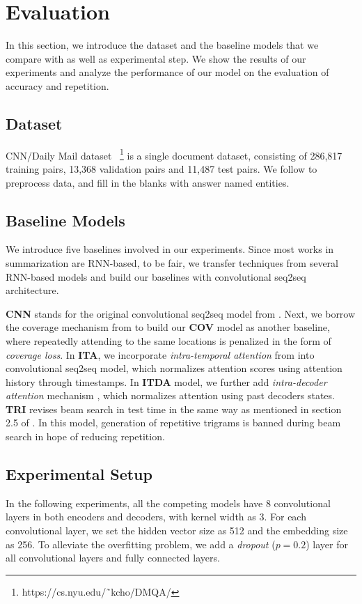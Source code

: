 \section{Evaluation}
\label{sec:eval}
In this section, we introduce the dataset 
and the baseline models that we compare with 
as well as experimental step.
We show the results of our experiments and analyze 
the performance of our model on the evaluation of accuracy
and repetition.


\subsection{Dataset}
CNN/Daily Mail dataset~\cite{HermannKGEKSB15,NallapatiZSGX16,SeeLM17}
\footnote{https://cs.nyu.edu/˜kcho/DMQA/} is a single document dataset,
consisting of 286,817 training pairs,
13,368 validation pairs and 11,487 test pairs.
We follow  to preprocess data,
and fill in the blanks with answer named entities.

\subsection{Baseline Models}
We introduce five baselines involved in our experiments. Since most works in summarization are RNN-based, to be fair, we transfer techniques from several RNN-based models and build our baselines with convolutional seq2seq architecture.

\textbf{CNN} stands for the original convolutional seq2seq model from \cite{gehring2017convs2s}. Next, we borrow the coverage mechanism from \cite{SeeLM17} to build our \textbf{COV} model as another baseline, where repeatedly
attending to the same locations is penalized in the form of \textit{coverage loss}. In \textbf{ITA}, we incorporate \textit{intra-temporal attention} from \cite{PaulusXS17} into convolutional seq2seq model, which normalizes attention scores using attention history through timestamps. In \textbf{ITDA} model, we further add \textit{intra-decoder attention} mechanism \cite{PaulusXS17}, which normalizes attention using past decoders states. \textbf{TRI} revises beam search in test time in the same way as mentioned in section 2.5 of \cite{PaulusXS17}. In this model, generation of repetitive trigrams is banned during beam search in hope of reducing repetition.

\subsection{Experimental Setup}
\label{sec:expset}
In the following experiments, 
all the competing models have 8 convolutional layers in
both encoders and decoders, with kernel width as 3.
For each convolutional layer, 
we set the hidden vector size as 512 and the embedding size as 256.
To alleviate the overfitting problem,
we add a \textit{dropout} ($p=0.2$) layer for 
all convolutional layers and fully connected layers.

